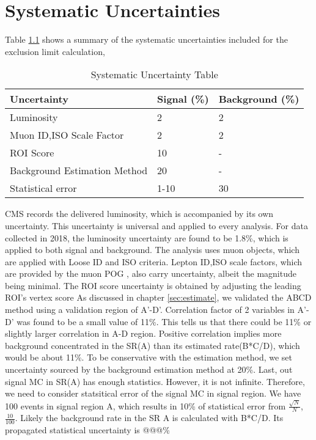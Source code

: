 \clearpage
\chapter{Systematic Uncertainties}\label{sec:systs}
Table \ref{tab:systab} shows a summary of the systematic uncertainties included for the exclusion limit calculation,

\begin{table}[htb!]
  \caption{Systematic Uncertainty Table}
  \begin{center}
    \begin{tabular}{l|l|l}\hline
     Uncertainty    & Signal (\%) & Background (\%)\\
      \hline
     Luminosity     & 2 & 2\\
      \hline
     Muon ID,ISO Scale Factor     & 2 & 2 \\
      \hline
     ROI Score      & 10 & -\\
      \hline
     Background Estimation Method     & 20 & - \\
      \hline
     Statistical error     & 1-10 & 30 \\
      \hline
    \end{tabular}
    \label{tab:systab}
  \end{center}
\end{table}

CMS records the delivered luminosity, which is accompanied by its own uncertainty.
This uncertainty is universal and applied to every analysis.
For data collected in 2018, the luminosity uncertainty are found to be 1.8\%, which is applied to both signal and background. 
The analysis uses muon objects, which are applied with Loose ID and ISO criteria.
Lepton ID,ISO scale factors, which are provided by the muon POG \cite{muonpog}, also carry uncertainty, albeit the magnitude being minimal.
The ROI score uncertainty is obtained by adjusting the leading ROI's vertex score 
As discussed in chapter \ref{sec:estimate}, we validated the ABCD method using a validation region of A'-D'.
Correlation factor of 2 variables in A'-D' was found to be a small value of 11\%.
This tells us that there could be 11\% or slightly larger correlation in A-D region.
Positive correlation implies more background concentrated in the SR(A) than its estimated rate(B*C/D), which would be about 11\%.
To be conservative with the estimation method, we set uncertainty sourced by the background estimation method at 20\%.
Last, out signal MC in SR(A) has enough statistics.
However, it is not infinite. 
Therefore, we need to consider statsitical error of the signal MC in signal region.
We have 100 events in signal region A, which results in 10\% of statistical error from $\frac{\sqrt{N}}{N}$, $\frac{10}{100}$.
Likely the background rate in the SR A is calculated with B*C/D.
Its propagated statistical uncertainty is @@@\%
